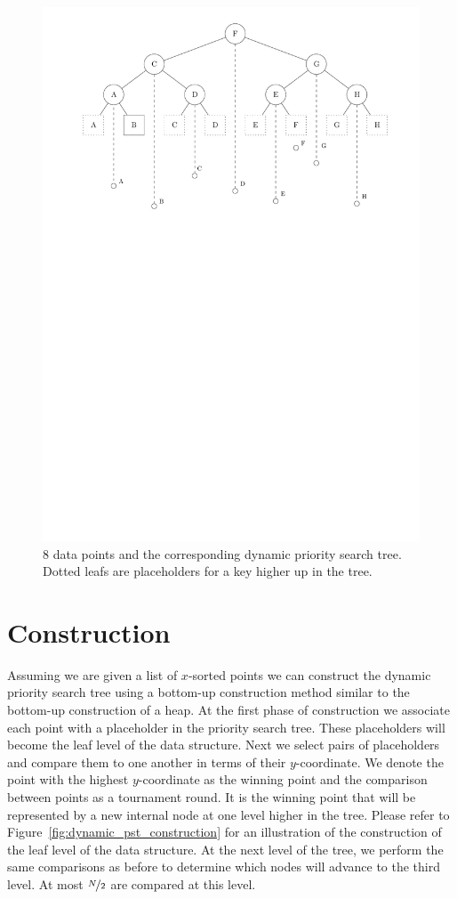 \documentclass[twoside,11pt,openright]{report}
\begin{document}
\begin{figure}[h]
	\centering
	\includegraphics[scale=0.68]{../figures/internal_pst_dynamic}
	\caption{8 data points and the corresponding dynamic priority search tree. Dotted leafs are placeholders for a key higher up in the tree.}
	\label{fig:dynamic_pst}
\end{figure}

\section{Construction}
Assuming we are given a list of $x$-sorted points we can construct the dynamic priority search tree using a bottom-up construction method similar to the bottom-up construction of a heap. At the first phase of construction we associate each point with a placeholder in the priority search tree. These placeholders will become the leaf level of the data structure. Next we select pairs of placeholders and compare them to one another in terms of their $y$-coordinate. We denote the point with the highest $y$-coordinate as the winning point and the comparison between points as a tournament round. It is the winning point that will be represented by a new internal node at one level higher in the tree. Please refer to Figure~\ref{fig:dynamic_pst_construction} for an illustration of the construction of the leaf level of the data structure.
At the next level of the tree, we perform the same comparisons as before to determine which nodes will advance to the third level. At most $\nicefrac{N}{2}$ are compared at this level.
\end{document}
